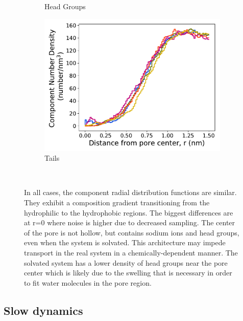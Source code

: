 \documentclass[journal=jpcbfk,manuscript=article]{achemso}
\begin{document}
\begin{figure}[!htb]
\begin{subfigure}{0.32\textwidth}
        \caption{Head Groups}
        \label{fig:head_groups_regional_density}
  \end{subfigure}
  \begin{subfigure}{0.32\textwidth}
        \includegraphics[width=1\linewidth]{tails_density.pdf}
        \caption{Tails}
        \label{fig:tails_regional_density}
  \end{subfigure}
  \caption{In all cases, the component radial distribution functions are similar. 
      They exhibit a composition gradient transitioning from the hydrophilic to the hydrophobic
	  regions. The biggest differences are at r=0 where noise is higher due to 
	  decreased sampling. The center of the pore is not hollow, but contains sodium ions and 
	  head groups, even when the system is solvated. This architecture may impede transport in 
	  the real system in a chemically-dependent manner. 
          The solvated system has a lower density of head groups near the 
	  pore center which is likely due to the swelling that is necessary in order to fit water
	  molecules in the pore region.}~\label{fig:overlaid_densities}
  \end{figure}

  \subsection{Slow dynamics}\label{section:slow_dynamics}
  
\end{document}
